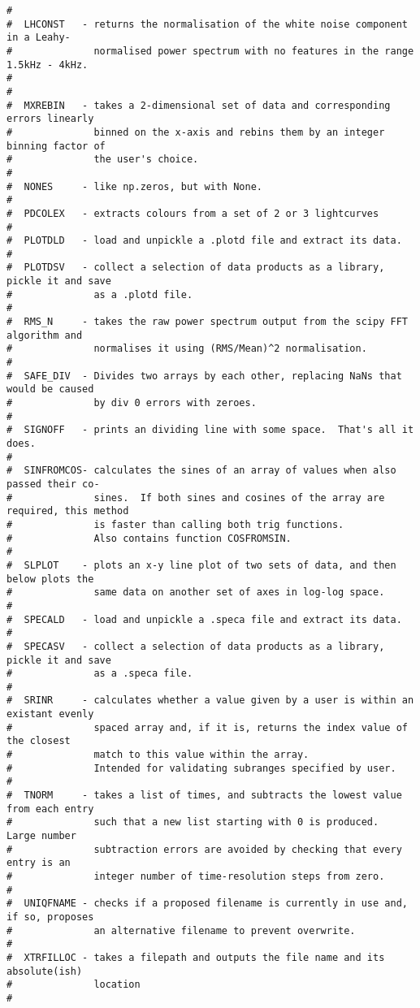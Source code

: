 \begin{verbatim}
#
#  LHCONST   - returns the normalisation of the white noise component in a Leahy-
#              normalised power spectrum with no features in the range 1.5kHz - 4kHz.
# 
#
#  MXREBIN   - takes a 2-dimensional set of data and corresponding errors linearly
#              binned on the x-axis and rebins them by an integer binning factor of
#              the user's choice.
#
#  NONES     - like np.zeros, but with None.
#
#  PDCOLEX   - extracts colours from a set of 2 or 3 lightcurves
#
#  PLOTDLD   - load and unpickle a .plotd file and extract its data.
#
#  PLOTDSV   - collect a selection of data products as a library, pickle it and save
#              as a .plotd file.
#
#  RMS_N     - takes the raw power spectrum output from the scipy FFT algorithm and
#              normalises it using (RMS/Mean)^2 normalisation.
#
#  SAFE_DIV  - Divides two arrays by each other, replacing NaNs that would be caused
#              by div 0 errors with zeroes.
#
#  SIGNOFF   - prints an dividing line with some space.  That's all it does.
#
#  SINFROMCOS- calculates the sines of an array of values when also passed their co-
#              sines.  If both sines and cosines of the array are required, this method
#              is faster than calling both trig functions.
#              Also contains function COSFROMSIN.
#
#  SLPLOT    - plots an x-y line plot of two sets of data, and then below plots the
#              same data on another set of axes in log-log space.
#
#  SPECALD   - load and unpickle a .speca file and extract its data.
# 
#  SPECASV   - collect a selection of data products as a library, pickle it and save
#              as a .speca file.
#
#  SRINR     - calculates whether a value given by a user is within an existant evenly
#              spaced array and, if it is, returns the index value of the closest
#              match to this value within the array.
#              Intended for validating subranges specified by user.
#
#  TNORM     - takes a list of times, and subtracts the lowest value from each entry
#              such that a new list starting with 0 is produced.  Large number
#              subtraction errors are avoided by checking that every entry is an
#              integer number of time-resolution steps from zero.
#
#  UNIQFNAME - checks if a proposed filename is currently in use and, if so, proposes
#              an alternative filename to prevent overwrite.
#
#  XTRFILLOC - takes a filepath and outputs the file name and its absolute(ish)
#              location
#
\end{verbatim}
